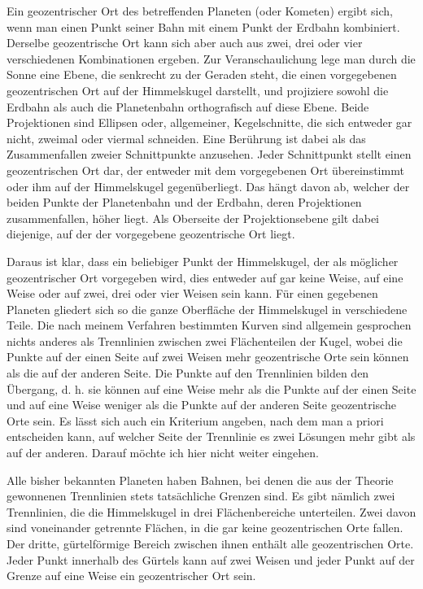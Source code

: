 Ein geozentrischer Ort des betreffenden Planeten (oder Kometen) ergibt sich, wenn man einen Punkt seiner Bahn mit einem Punkt der Erdbahn kombiniert. Derselbe geozentrische Ort kann sich aber auch aus zwei, drei oder vier verschiedenen Kombinationen ergeben. Zur Veranschaulichung lege man durch die Sonne eine Ebene, die senkrecht zu der Geraden steht, die einen vorgegebenen geozentrischen Ort auf der Himmelskugel darstellt, und projiziere sowohl die Erdbahn als auch die Planetenbahn orthografisch auf diese Ebene. Beide Projektionen sind Ellipsen oder, allgemeiner, Kegelschnitte, die sich entweder gar nicht, zweimal oder viermal schneiden. Eine Berührung ist dabei als das Zusammenfallen zweier Schnittpunkte anzusehen. Jeder Schnittpunkt stellt einen geozentrischen Ort dar, der entweder mit dem vorgegebenen Ort übereinstimmt oder ihm auf der Himmelskugel gegenüberliegt. Das hängt davon ab, welcher der beiden Punkte der Planetenbahn und der Erdbahn, deren Projektionen zusammenfallen, höher liegt. Als Oberseite der Projektionsebene gilt dabei diejenige, auf der der vorgegebene geozentrische Ort liegt.

Daraus ist klar, dass ein beliebiger Punkt der Himmelskugel, der als möglicher geozentrischer Ort vorgegeben wird, dies entweder auf gar keine Weise, auf eine Weise oder auf zwei, drei oder vier Weisen sein kann. Für einen gegebenen Planeten gliedert sich so die ganze Oberfläche der Himmelskugel in verschiedene Teile. Die nach meinem Verfahren bestimmten Kurven sind allgemein gesprochen nichts anderes als Trennlinien zwischen zwei Flächenteilen der Kugel, wobei die Punkte auf der einen Seite auf zwei Weisen mehr geozentrische Orte sein können als die auf der
anderen Seite. Die Punkte auf den Trennlinien bilden den Übergang, d. h. sie können auf eine Weise mehr als die Punkte auf der einen Seite und auf eine Weise weniger als die Punkte auf der anderen Seite geozentrische Orte sein. Es lässt sich auch ein Kriterium angeben, nach dem man a priori entscheiden kann, auf welcher Seite der Trennlinie es zwei Lösungen mehr gibt als auf der anderen. Darauf möchte ich hier nicht weiter eingehen\HistoricalNoteEight{Siehe Notiz 17.]}.

Alle bisher bekannten Planeten haben Bahnen, bei denen die aus der Theorie gewonnenen Trennlinien stets tatsächliche Grenzen sind. Es gibt nämlich zwei Trennlinien, die die Himmelskugel in drei Flächenbereiche unterteilen. Zwei davon sind voneinander getrennte Flächen, in die gar keine geozentrischen Orte fallen. Der dritte, gürtelförmige Bereich zwischen ihnen enthält alle geozentrischen Orte. Jeder Punkt innerhalb des Gürtels kann auf zwei Weisen und jeder Punkt auf der Grenze auf eine Weise ein geozentrischer Ort sein.

